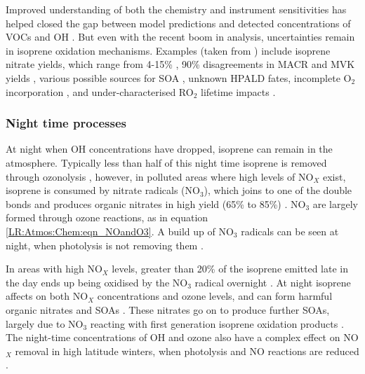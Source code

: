       
      
      Improved understanding of both the chemistry and instrument sensitivities has helped closed the gap between model predictions and detected concentrations of VOCs and OH \parencite{Mao2012}.
      But even with the recent boom in analysis, uncertainties remain in isoprene oxidation mechanisms.
      Examples (taken from \textcite{Nguyen2014}) include isoprene nitrate yields, which range from 4-15\% \parencite{Paulot2009a}, 90\% disagreements in MACR and MVK yields \parencite{Liu2013}, various possible sources for SOA \parencite{Chan2010, Surratt2010, Lin2013}, unknown HPALD fates, incomplete O$_2$ incorporation \parencite{Peeters2009,Crounse2013}, and under-characterised RO$_2$ lifetime impacts \parencite{Wolfe2012}.
      
      
    
    \subsubsection{Night time processes}
      At night when OH concentrations have dropped, isoprene can remain in the atmosphere.
      Typically less than half of this night time isoprene is removed through ozonolysis \parencite{AtkinsonArey2003}, however, in polluted areas where high levels of NO$_X$ exist, isoprene is consumed by nitrate radicals (NO$_3$), which joins to one of the double bonds and produces organic nitrates in high yield (65\% to 85\%) \parencite{Mao2013}.
      NO$_3$ are largely formed through ozone reactions, as in equation \ref{LR:Atmos:Chem:eqn_NOandO3}.
      A build up of NO$_3$ radicals can be seen at night, when photolysis is not removing them \parencite{Atkinson2000,Brown2009}.
      
      In areas with high NO$_X$ levels, greater than 20\% of the isoprene emitted late in the day ends up being oxidised by the NO$_3$ radical overnight \parencite{Brown2009}.
      At night isoprene affects on both NO$_X$ concentrations and ozone levels, and can form harmful organic nitrates and SOAs \parencite{Brown2009, Mao2013}.
      These nitrates go on to produce further SOAs, largely due to NO$_3$ reacting with first generation isoprene oxidation products \parencite{Rollins2009}.
      The night-time concentrations of OH and ozone also have a complex effect on NO$_X$ removal in high latitude winters, when photolysis and NO reactions are reduced \parencite{Ayers2006}.
      
